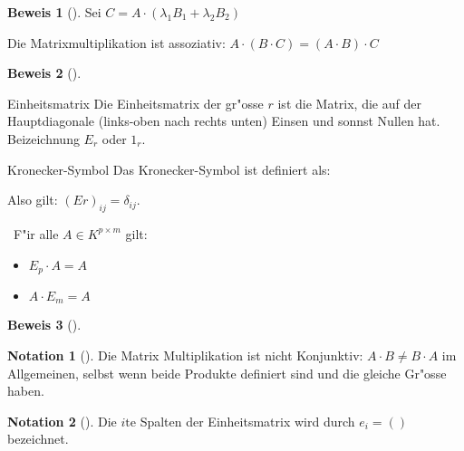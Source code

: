 \documentclass[fontsize=11pt,paper=a4,BCOR=0mm,DIV=11,automark,headsepline]{scrbook}
\theoremstyle{remark}
\theoremstyle{definition}
\newtheorem*{notation}{Notation}
\theoremstyle{proof}
\newtheorem*{prof}{Beweis}
\theoremstyle{remark}
\begin{document}
\begin{prof}[] \label{}
Sei \(C=A\cdot (\lambda_1 B_1 + \lambda_2 B_2)\)
\end{prof}

\begin{relation}
Die Matrixmultiplikation ist assoziativ: \(A\cdot (B\cdot C)=(A\cdot B)\cdot C\)
\end{relation}

\begin{prof}[] \label{}

\end{prof}

\begin{definition}{Einheitsmatrix}{}
Die Einheitsmatrix der gr"osse \(r\) ist die Matrix, die auf der Hauptdiagonale
(links-oben nach rechts unten) Einsen und sonnst Nullen hat. Beizeichnung \(E_r\)
oder \(1_r\).
\end{definition}

\begin{definition}{Kronecker-Symbol}{}
Das Kronecker-Symbol ist definiert als: 

Also gilt: \((Er)_{ij}=\delta_{ij}\).
\end{definition}

\begin{theo}{}{} \
F"ir alle \(A\in K^{p\times m}\) gilt:
\begin{itemize}
\item \(E_p\cdot A=A\)
\item \(A\cdot E_m =A\)
\end{itemize}
\end{theo}

\begin{prof}[] \label{}

\end{prof}


\begin{notation}[] \label{Vorsicht!}
Die Matrix Multiplikation ist nicht Konjunktiv: \(A\cdot B\not= B\cdot A\) im
Allgemeinen, selbst wenn beide Produkte definiert sind und die gleiche Gr"osse
haben.
\end{notation}

\begin{exa} \label{}

\end{exa}

\begin{notation}[] \label{}
Die \(i\text{te}\) Spalten der Einheitsmatrix wird durch \(e_i=()\) bezeichnet.
\end{notation}
\end{document}
